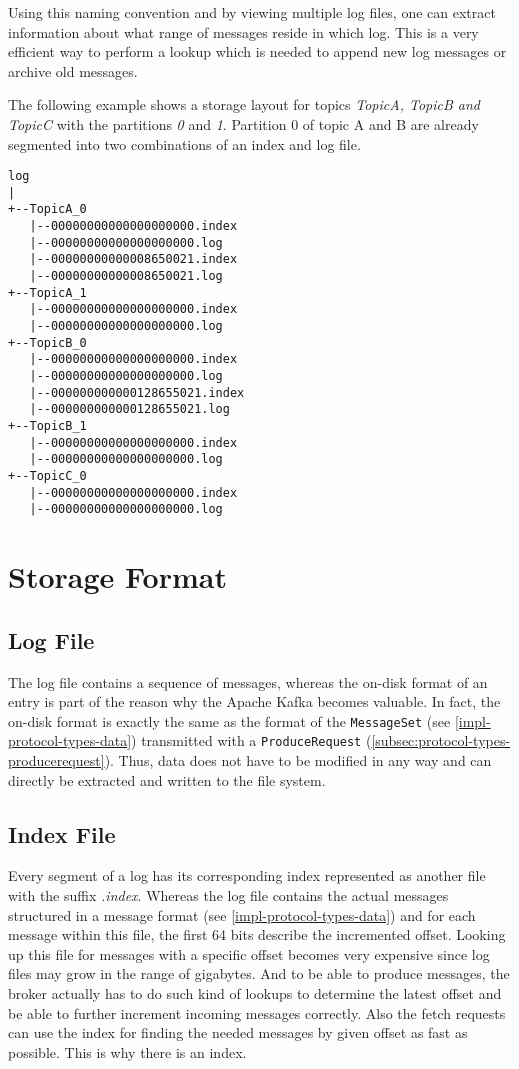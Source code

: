 Using this naming convention and by viewing multiple log files, one can extract
information about what range of messages reside in which log. This is a very
efficient way to perform a lookup which is needed to append new log messages or
archive old messages.

The following example shows a storage layout for topics \textit{TopicA, TopicB
and TopicC} with the partitions \textit{0} and \textit{1}. Partition 0 of topic
A and B are already segmented into two combinations of an index and log file.

\begin{verbatim}
log
|
+--TopicA_0
   |--00000000000000000000.index
   |--00000000000000000000.log
   |--00000000000008650021.index
   |--00000000000008650021.log
+--TopicA_1
   |--00000000000000000000.index
   |--00000000000000000000.log
+--TopicB_0
   |--00000000000000000000.index
   |--00000000000000000000.log
   |--000000000000128655021.index
   |--000000000000128655021.log
+--TopicB_1
   |--00000000000000000000.index
   |--00000000000000000000.log
+--TopicC_0
   |--00000000000000000000.index
   |--00000000000000000000.log
\end{verbatim}

\section{Storage Format}
\subsection{Log File}

The log file contains a sequence of messages, whereas the on-disk format of an
entry is part of the reason why the Apache Kafka becomes valuable. In fact, the
on-disk format is exactly the same as the format of the \lstinline{MessageSet}
(see \ref{impl-protocol-types-data}) transmitted with a
\lstinline{ProduceRequest} (\ref{subsec:protocol-types-producerequest}). Thus,
data does not have to be modified in any way and can directly be extracted and
written to the file system.

\subsection{Index File}

Every segment of a log has its corresponding index represented as another file with
the suffix \textit{.index}. Whereas the log file contains the actual messages
structured in a message format (see \ref{impl-protocol-types-data}) and for each
message within this file, the first 64 bits describe the incremented offset.
Looking up this file for messages with a specific offset becomes very expensive
since log files may grow in the range of gigabytes. And to be able to produce
messages, the broker actually has to do such kind of lookups to determine the
latest offset and be able to further increment incoming messages correctly.
Also the fetch requests can use the index for finding the needed messages by
given offset as fast as possible. This is why there is an index.

